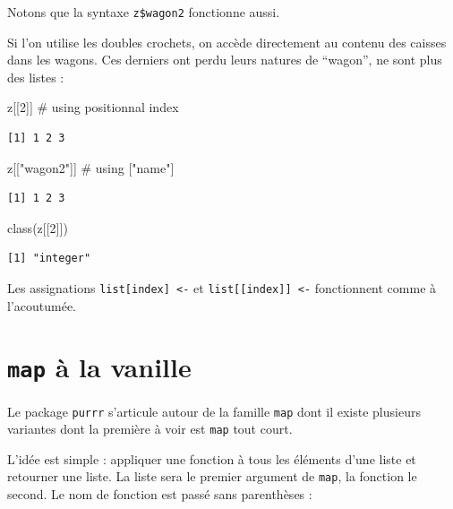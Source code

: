 \documentclass[
  letterpaper,
  DIV=11,
  numbers=noendperiod]{scrreprt}
\newenvironment{Shaded}{\begin{snugshade}}{\end{snugshade}}
\newcommand{\CommentTok}[1]{\textcolor[rgb]{0.37,0.37,0.37}{#1}}
\newcommand{\DecValTok}[1]{\textcolor[rgb]{0.68,0.00,0.00}{#1}}
\newcommand{\FunctionTok}[1]{\textcolor[rgb]{0.28,0.35,0.67}{#1}}
\newcommand{\NormalTok}[1]{\textcolor[rgb]{0.00,0.23,0.31}{#1}}
\newcommand{\StringTok}[1]{\textcolor[rgb]{0.13,0.47,0.30}{#1}}
\begin{document}
Notons que la syntaxe \texttt{z\$wagon2} fonctionne aussi.

Si l'on utilise les doubles crochets, on accède directement au contenu
des caisses dans les wagons. Ces derniers ont perdu leurs natures de
``wagon'', ne sont plus des listes :

\begin{Shaded}
\begin{Highlighting}[]
\NormalTok{z[[}\DecValTok{2}\NormalTok{]]        }\CommentTok{\# using positionnal index}
\end{Highlighting}
\end{Shaded}

\begin{verbatim}
[1] 1 2 3
\end{verbatim}

\begin{Shaded}
\begin{Highlighting}[]
\NormalTok{z[[}\StringTok{"wagon2"}\NormalTok{]] }\CommentTok{\# using ["name"]}
\end{Highlighting}
\end{Shaded}

\begin{verbatim}
[1] 1 2 3
\end{verbatim}

\begin{Shaded}
\begin{Highlighting}[]
\FunctionTok{class}\NormalTok{(z[[}\DecValTok{2}\NormalTok{]])}
\end{Highlighting}
\end{Shaded}

\begin{verbatim}
[1] "integer"
\end{verbatim}

Les assignations \texttt{list{[}index{]}\ \textless{}-} et
\texttt{list{[}{[}index{]}{]}\ \textless{}-} fonctionnent comme à
l'acoutumée.

\hypertarget{map-uxe0-la-vanille}{%
\section{\texorpdfstring{\texttt{map} à la
vanille}{map à la vanille}}\label{map-uxe0-la-vanille}}

Le package \texttt{purrr} s'articule autour de la famille \texttt{map}
dont il existe plusieurs variantes dont la première à voir est
\texttt{map} tout court.

L'idée est simple : appliquer une fonction à tous les éléments d'une
liste et retourner une liste. La liste sera le premier argument de
\texttt{map}, la fonction le second. Le nom de fonction est passé sans
parenthèses :
\end{document}
